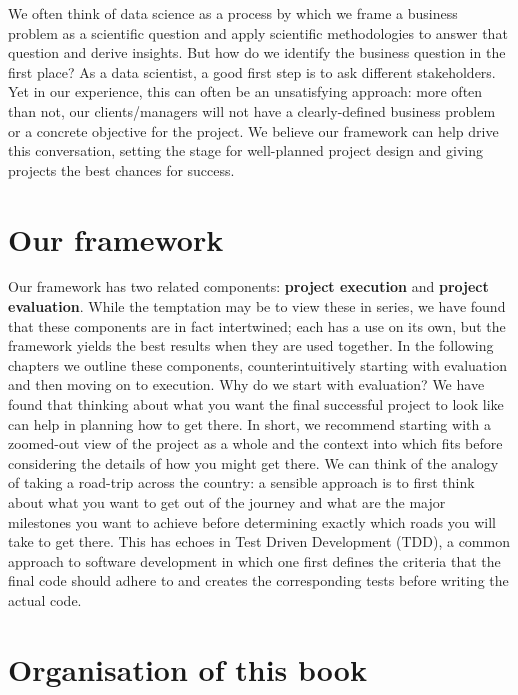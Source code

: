 \documentclass[
]{book}
\begin{document}
We often think of data science as a process by which we frame a business problem as a scientific question and apply scientific methodologies to answer that question and derive insights. But how do we identify the business question in the first place? As a data scientist, a good first step is to ask different stakeholders. Yet in our experience, this can often be an unsatisfying approach: more often than not, our clients/managers will not have a clearly-defined business problem or a concrete objective for the project. We believe our framework can help drive this conversation, setting the stage for well-planned project design and giving projects the best chances for success.

\hypertarget{our-framework}{%
\section{Our framework}\label{our-framework}}

Our framework has two related components: \textbf{project execution} and \textbf{project evaluation}. While the temptation may be to view these in series, we have found that these components are in fact intertwined; each has a use on its own, but the framework yields the best results when they are used together. In the following chapters we outline these components, counterintuitively starting with evaluation and then moving on to execution. Why do we start with evaluation? We have found that thinking about what you want the final successful project to look like can help in planning how to get there. In short, we recommend starting with a zoomed-out view of the project as a whole and the context into which fits before considering the details of how you might get there. We can think of the analogy of taking a road-trip across the country: a sensible approach is to first think about what you want to get out of the journey and what are the major milestones you want to achieve before determining exactly which roads you will take to get there. This has echoes in Test Driven Development (TDD), a common approach to software development in which one first defines the criteria that the final code should adhere to and creates the corresponding tests before writing the actual code.

\hypertarget{organisation-of-this-book}{%
\section{Organisation of this book}\label{organisation-of-this-book}}
\end{document}
